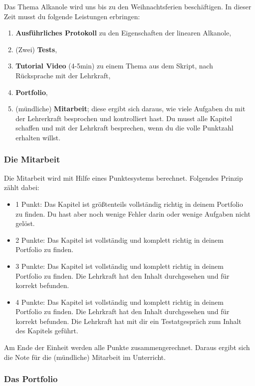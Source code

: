 \documentclass{scrartcl}  %
\begin{document}
					Das Thema Alkanole wird uns bis zu den Weihnachtsferien beschäftigen. In dieser Zeit musst du folgende Leistungen erbringen:
					\begin{enumerate}
						\item \textbf{Ausführliches Protokoll} zu den Eigenschaften der linearen Alkanole,
						\item (Zwei) \textbf{Tests},
						\item \textbf{Tutorial Video} (4-5min) zu einem Thema aus dem Skript, nach Rücksprache mit der Lehrkraft,
						\item \textbf{Portfolio},
						\item (mündliche) \textbf{Mitarbeit}; diese ergibt sich daraus, wie viele Aufgaben du mit der Lehrerkraft besprochen und kontrolliert hast.  Du musst alle Kapitel schaffen und mit der Lehrkraft besprechen, wenn du die volle Punktzahl erhalten willst.
					\end{enumerate}
	
					\subsubsection{Die Mitarbeit}
						
						Die Mitarbeit wird mit Hilfe eines Punktesystems berechnet. Folgendes Prinzip zählt dabei:
						\begin{itemize}
							\item 1 Punkt: Das Kapitel ist größtenteils vollständig richtig in deinem Portfolio zu finden. Du hast aber noch wenige Fehler darin oder wenige Aufgaben nicht gelöst.
							\item 2 Punkte: Das Kapitel ist vollständig und komplett richtig in deinem Portfolio zu finden.
							\item 3 Punkte: Das Kapitel ist vollständig und komplett richtig in deinem Portfolio zu finden. Die Lehrkraft hat den Inhalt durchgesehen und für korrekt befunden.
							\item 4 Punkte: Das Kapitel ist vollständig und komplett richtig in deinem Portfolio zu finden. Die Lehrkraft hat den Inhalt durchgesehen und für korrekt befunden. Die Lehrkraft hat mit dir ein Testatgespräch zum Inhalt des Kapitels geführt.
						\end{itemize}
						Am Ende der Einheit werden alle Punkte zusammengerechnet. Daraus ergibt sich die Note für die (mündliche) Mitarbeit im Unterricht.
	
					\subsubsection{Das Portfolio}
					
\end{document}

